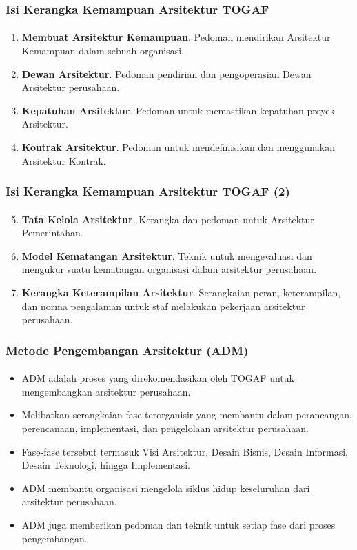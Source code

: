 \documentclass[aspectratio=169, table]{beamer}
\begin{document}
	\begin{frame}
		\frametitle{Isi Kerangka Kemampuan Arsitektur TOGAF}
		\framesubtitle{\hspace{1cm}}
		\begin{enumerate}
			\item \textbf{Membuat Arsitektur Kemampuan}. Pedoman mendirikan Arsitektur Kemampuan
			dalam sebuah organisasi.
			\item \textbf{Dewan Arsitektur}. Pedoman pendirian dan pengoperasian Dewan Arsitektur perusahaan.
			\item \textbf{Kepatuhan Arsitektur}. Pedoman untuk memastikan kepatuhan proyek Arsitektur.
			\item \textbf{Kontrak Arsitektur}. Pedoman untuk mendefinisikan dan menggunakan Arsitektur Kontrak.
		\end{enumerate}
	\end{frame}

		\begin{frame}
		\frametitle{Isi Kerangka Kemampuan Arsitektur TOGAF (2)}
		\framesubtitle{\hspace{1cm}}
		\begin{enumerate}
			\setcounter{enumi}{4}
			\item \textbf{Tata Kelola Arsitektur}. Kerangka dan pedoman untuk Arsitektur Pemerintahan.
			\item \textbf{Model Kematangan Arsitektur}. Teknik untuk mengevaluasi dan mengukur suatu kematangan organisasi dalam arsitektur perusahaan.
			\item \textbf{Kerangka Keterampilan Arsitektur}. Serangkaian peran, keterampilan, dan norma pengalaman untuk staf melakukan pekerjaan arsitektur perusahaan.
		\end{enumerate}
	\end{frame}


	\begin{frame}
		\frametitle{Metode Pengembangan Arsitektur (ADM)}
		\framesubtitle{\hspace{1cm}}
        \vspace{20pt}
		\begin{itemize}
			\item ADM adalah proses yang direkomendasikan oleh TOGAF untuk mengembangkan arsitektur perusahaan.
			\item Melibatkan serangkaian fase terorganisir yang membantu dalam perancangan, perencanaan, implementasi, dan pengelolaan arsitektur perusahaan.
			\item Fase-fase tersebut termasuk Visi Arsitektur, Desain Bisnis, Desain Informasi, Desain Teknologi, hingga Implementasi.
			\item ADM membantu organisasi mengelola siklus hidup keseluruhan dari arsitektur perusahaan.
			\item ADM juga memberikan pedoman dan teknik untuk setiap fase dari proses pengembangan.
		\end{itemize}
	\end{frame}
\end{document}
